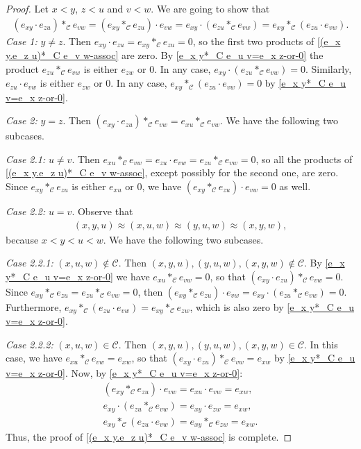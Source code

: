 \documentclass{jonasart}
\newcommand{\C}{\mathcal{C}}
\begin{document}
	\begin{proof}
		Let $x<y$, $z<u$ and $v<w$. We are going to show that
		\begin{align}\label{(e_x y.e_z u)*_C e_v w-assoc}
			(e_{xy}\cdot e_{zu})*_\C e_{vw}=(e_{xy}*_\C e_{zu})\cdot e_{vw}=e_{xy}\cdot (e_{zu}*_\C e_{vw})=e_{xy}*_\C (e_{zu}\cdot e_{vw}).
		\end{align}
		\textit{Case 1:} $y\ne z$. Then $e_{xy}\cdot e_{zu}=e_{xy}*_\C e_{zu}=0$, so the first two products of \eqref{(e_x y.e_z u)*_C e_v w-assoc} are zero. By \eqref{e_x y*_C e_u v=e_x z-or-0} the product $e_{zu}*_\C e_{vw}$ is either $e_{zw}$ or $0$. In any case, $e_{xy}\cdot (e_{zu}*_\C e_{vw})=0$. Similarly, $e_{zu}\cdot e_{vw}$ is either $e_{zw}$ or $0$. In any case, $e_{xy}*_\C (e_{zu}\cdot e_{vw})=0$ by \eqref{e_x y*_C e_u v=e_x z-or-0}.

		\textit{Case 2:} $y=z$. Then $(e_{xy}\cdot e_{zu})*_\C e_{vw}=e_{xu}*_\C e_{vw}$. We have the following two subcases.

		\textit{Case 2.1:} $u\ne v$. Then $e_{xu}*_\C e_{vw}=e_{zu}\cdot e_{vw}=e_{zu}*_\C e_{vw}=0$, so all the products of \eqref{(e_x y.e_z u)*_C e_v w-assoc}, except possibly for the second one, are zero. Since $e_{xy}*_\C e_{zu}$ is either $e_{xu}$ or $0$, we have $(e_{xy}*_\C e_{zu})\cdot e_{vw}=0$ as well.

		\textit{Case 2.2:} $u=v$. Observe that
		\begin{align}\label{(xyu)-(xuw)-(yuw)-(xyw)}
			(x,y,u)\approx(x,u,w)\approx(y,u,w)\approx(x,y,w),
		\end{align}
		because $x<y<u<w$. We have the following two subcases.

		\textit{Case 2.2.1:} $(x,u,w)\not\in\C$. Then $(x,y,u),(y,u,w),(x,y,w)\not\in\C$. By \eqref{e_x y*_C e_u v=e_x z-or-0} we have $e_{xu}*_\C e_{vw}=0$, so that $(e_{xy}\cdot e_{zu})*_\C e_{vw}=0$. Since $e_{xy}*_\C e_{zu}=e_{zu}*_\C e_{vw}=0$, then $(e_{xy}*_\C e_{zu})\cdot e_{vw}=e_{xy}\cdot (e_{zu}*_\C e_{vw})=0$. Furthermore, $e_{xy}*_\C (e_{zu}\cdot e_{vw})=e_{xy}*_\C e_{zw}$, which is also zero by \eqref{e_x y*_C e_u v=e_x z-or-0}.

		\textit{Case 2.2.2:} $(x,u,w)\in\C$. Then $(x,y,u),(y,u,w),(x,y,w)\in\C$. In this case, we have $e_{xu}*_\C e_{vw}=e_{xw}$, so that $(e_{xy}\cdot e_{zu})*_\C e_{vw}=e_{xw}$ by \eqref{e_x y*_C e_u v=e_x z-or-0}. Now,         by \eqref{e_x y*_C e_u v=e_x z-or-0}:
        \begin{gather*}
            (e_{xy}*_\C e_{zu})\cdot e_{vw}
            =e_{xu}\cdot e_{vw}
            =e_{xw}, \\
            e_{xy}\cdot (e_{zu}*_\C e_{vw})
            =e_{xy}\cdot e_{zw}
            =e_{xw}, \\
            e_{xy}*_\C (e_{zu}\cdot e_{vw})
            =e_{xy}*_\C e_{zw}
            =e_{xw}.
        \end{gather*}
		Thus, the proof of \eqref{(e_x y.e_z u)*_C e_v w-assoc} is complete.


\end{proof}
\end{document}
